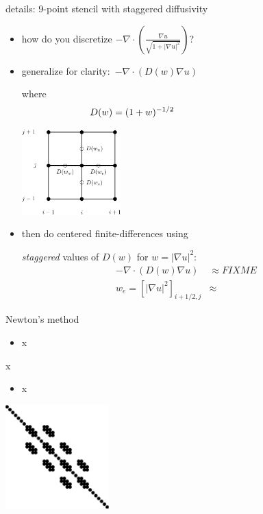 \documentclass[10pt,
               svgnames,
               hyperref={colorlinks,citecolor=DeepPink4,linkcolor=FireBrick,urlcolor=Maroon},
               usepdftitle=false]{beamer}
\newcommand{\grad}{\nabla}
\newcommand{\Div}{\nabla \cdot}
\newcommand{\ds}{\displaystyle}
\begin{document}
\begin{frame}{details: 9-point stencil with staggered diffusivity}
\begin{itemize}
\item how do you discretize $\ds -\Div \left(\frac{\grad u}{\sqrt{1 + |\grad u|^2}}\right)$?
\item generalize for clarity: \,$\ds -\Div \left(D(w) \grad u\right)$

where
    $$D(w) = (1+w)^{-1/2} \hspace{40mm}$$

\vspace{-24mm}
\hfill \includegraphics[width=0.3\textwidth]{images/msboxstencil.png}

\vspace{-5mm}
\item then do centered finite-differences using

\emph{staggered} values of $D(w)$ for $w=|\grad u|^2$:
\begin{align*}
-\Div \left(D(w) \grad u\right) &\approx FIXME \\
w_e = \left[|\grad u|^2\right]_{i+1/2,j} &\approx 
\end{align*}
\end{itemize}
\end{frame}


\begin{frame}{Newton's method}
\begin{itemize}
\item x
\end{itemize}
\end{frame}


\begin{frame}{x}
\begin{itemize}
\item x
\end{itemize}

\hfill \includegraphics[width=0.3\textwidth]{images/minimal-spy.png}
\end{frame}
\end{document}
